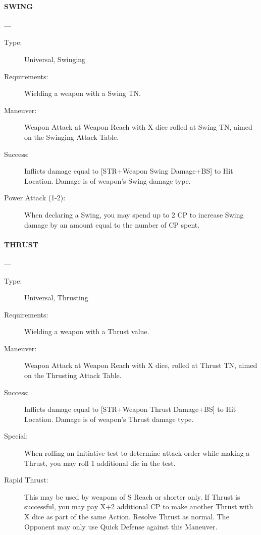 \documentclass[oneside,11pt,english]{book}
\begin{document}
\paragraph{\large\label{man:SWING} SWING}---\quad{\large[X]}
\vspace{-10pt}\begin{description} 
\item [Type:] Universal, Swinging 
\item [Requirements:] Wielding a weapon with a Swing TN. 
\item [Maneuver:] Weapon Attack at Weapon Reach with X dice rolled at Swing TN, aimed on the Swinging 
Attack Table. 
\item [Success:] Inflicts damage equal to [STR+Weapon Swing Damage+BS] to Hit Location. Damage is of 
weapon’s Swing damage type. 
\item [Power Attack (1-2):] When declaring a Swing, you may spend up to 2 CP to increase Swing damage by 
an amount equal to the number of CP spent. 
\end{description}
\paragraph{\large\label{man:THRUST} THRUST}---\quad{\large[X]}
\vspace{-10pt}\begin{description} 
\item [Type:] Universal, Thrusting 
\item [Requirements:] Wielding a weapon with a Thrust value. 
\item [Maneuver:] Weapon Attack at Weapon Reach with X dice, rolled at Thrust TN, aimed on the Thrusting 
Attack Table. 
\item [Success:] Inflicts damage equal to [STR+Weapon Thrust Damage+BS] to Hit Location. Damage is of 
weapon’s Thrust damage type. 
\item [Special:] When rolling an Initiative test to determine attack order while making a Thrust, you may roll 1 
additional die in the test. 
\item [Rapid Thrust:] This may be used by weapons of S Reach or shorter only. If Thrust is successful, you may 
pay X+2 additional CP to make another Thrust with X dice as part of the same Action. Resolve Thrust as 
normal. The Opponent may only use Quick Defense against this Maneuver. 
\end{description}
\end{document}
